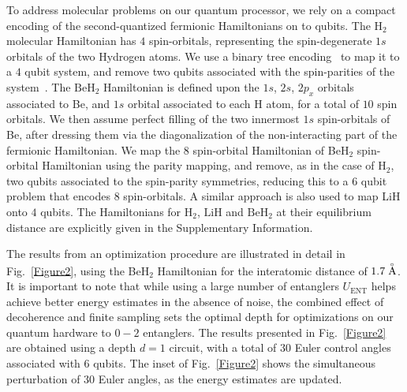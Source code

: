 \documentclass[twocolumn]{revtex4-1}
\newcommand{\1}{\mathbbm{1}}
\begin{document}
To address molecular problems on our quantum processor, we rely on a compact encoding of the second-quantized fermionic Hamiltonians on to qubits. The $\textrm{H}_2$ molecular Hamiltonian has $4$ spin-orbitals, representing the spin-degenerate $1s$ orbitals of the two Hydrogen atoms. We use a binary tree encoding~\cite{BK2002} to map it to a $4$ qubit system, and remove two qubits associated with the spin-parities of the system~\cite{Tapering}. The $\textrm{BeH}_2$ Hamiltonian is defined upon the $1s$, $2s$, $2p_x$ orbitals associated to Be, and $1s$ orbital associated to each H atom, for a total of $10$ spin orbitals. We then assume perfect filling of the two innermost $1s$ spin-orbitals of Be, after dressing them via the diagonalization of the non-interacting part of the fermionic Hamiltonian. We map the 8 spin-orbital Hamiltonian of BeH$_2$ spin-orbital Hamiltonian using the parity mapping, and remove, as in the case of $\textrm{H}_2$, two qubits associated to the spin-parity symmetries, reducing this to a $6$ qubit problem that encodes $8$ spin-orbitals. A similar approach is also used to map LiH onto $4$ qubits. The Hamiltonians for $\textrm{H}_2$, $\textrm{LiH}$ and $\textrm{BeH}_2$ at their equilibrium distance are explicitly given in the Supplementary Information.

The results from an optimization procedure are illustrated in detail in Fig.~\ref{Figure2}, using the BeH$_{2}$ Hamiltonian for the interatomic distance of $1.7 \buildrel _{\circ} \over {\mathrm{A}}$. It is important to note that while using a large number of entanglers $U_\textrm{ENT}$ helps achieve better energy estimates in the absence of noise, the combined effect of decoherence and finite sampling sets the optimal depth for optimizations on our quantum hardware to $0-2$ entanglers. The results presented in Fig.~\ref{Figure2} are obtained using a depth $d=1$ circuit, with a total of $30$ Euler control angles associated with $6$ qubits. The inset of Fig.~\ref{Figure2} shows the simultaneous perturbation of 30 Euler angles, as the energy estimates are updated. 
\end{document}
